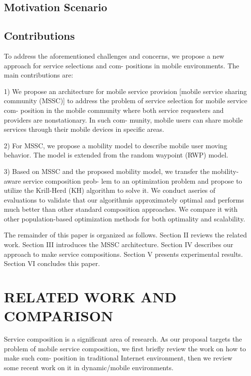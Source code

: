 \documentclass[10pt,journal,compsoc]{IEEEtran}
\begin{document}
\subsection{Motivation Scenario}

\subsection{Contributions}
To address the aforementioned challenges and concerns,
we propose a new approach for service selections and com- positions in mobile environments. The main contributions are:

1) We propose an architecture for mobile service provision [mobile service sharing community (MSSC)] to address the problem of service selection for mobile service com- position in the mobile community where both service requesters and providers are nonstationary. In such com- munity, mobile users can share mobile services through their mobile devices in specific areas.

2) For MSSC, we propose a mobility model to describe mobile user moving behavior. The model is extended from the random waypoint (RWP) model.

3) Based on MSSC and the proposed mobility model, we transfer the mobility-aware service composition prob- lem to an optimization problem and propose to utilize the Krill-Herd (KH) algorithm to solve it. We conduct aseries of evaluations to validate that our algorithmis approximately optimal and performs much better than other standard composition approaches. We compare it with other population-based optimization methods for both optimality and scalability.

The remainder of this paper is organized as follows.
Section II reviews the related work. Section III introduces the MSSC architecture. Section IV describes our approach to make service compositions. Section V presents experimental results. Section VI concludes this paper.





\section{RELATED WORK AND COMPARISON}
Service composition is a significant area of research. As our proposal targets the problem of mobile service composition, we first briefly review the work on how to make such com- position in traditional Internet environment, then we review some recent work on it in dynamic/mobile environments.
\end{document}

